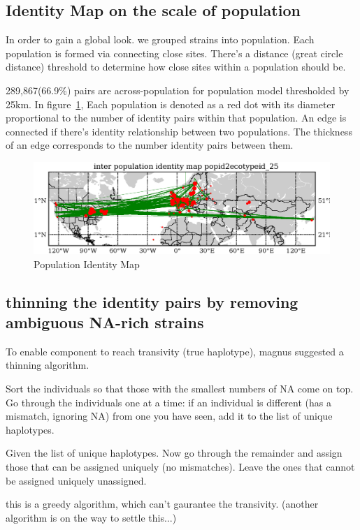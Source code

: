 \documentclass[a4paper,10pt]{article}
\begin{document}
\subsection{Identity Map on the scale of population}
In order to gain a global look. we grouped strains into population. Each population is formed via connecting close sites. There's a distance (great circle distance) threshold to determine how close sites within a population should be.

289,867(66.9\%) pairs are across-population for population model thresholded by 25km. In figure~\ref{f22}, Each population is denoted as a red dot with its diameter proportional to the number of identity pairs within that population. An edge is connected if there's identity relationship between two populations. The thickness of an edge corresponds to the number identity pairs between them.

\begin{figure}
\includegraphics[width=1\textwidth]{figures/identity_map1_site_network.eps}
\caption{Population Identity Map}\label{f22}
\end{figure}


\subsection{thinning the identity pairs by removing ambiguous NA-rich strains}
To enable component to reach transivity (true haplotype), magnus suggested a thinning algorithm.

Sort the individuals so that those with the smallest numbers of NA come on top.  Go through the individuals one at a time: if an individual is different (has a mismatch, ignoring NA) from one you have seen, add it to the list of unique haplotypes.

Given the list of unique haplotypes. Now go through the remainder and assign those that can be assigned uniquely (no mismatches).  Leave the ones that cannot be assigned uniquely unassigned.

this is a greedy algorithm, which can't gaurantee the transivity. (another algorithm is on the way to settle this...)
\end{document}
